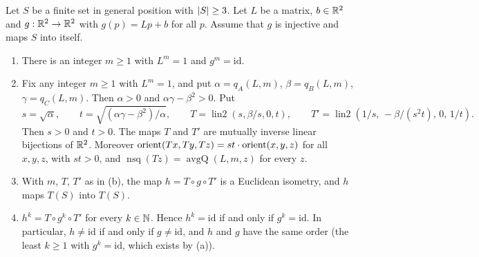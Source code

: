 \begin{proposition}\label{ar:prop:averaging}
Let $S$ be a finite set in general position with $\lvert S\rvert\ge3$. Let $L$ be a matrix, $b\in\mathbb R^2$ and
$g:\mathbb R^2\to\mathbb R^2$ with $g(p)=Lp+b$ for all $p$. Assume that $g$ is injective and maps $S$ into itself.
\begin{enumerate}[label=\textup{(\alph*)}]
\item There is an integer $m\ge1$ with $L^m=1$ and $g^m=\mathrm{id}$.
\item Fix any integer $m\ge1$ with $L^m=1$, and put $\alpha=q_A(L,m)$, $\beta=q_B(L,m)$, $\gamma=q_C(L,m)$. Then
$\alpha>0$ and $\alpha\gamma-\beta^2>0$. Put
\[
s=\sqrt\alpha,\qquad t=\sqrt{(\alpha\gamma-\beta^2)/\alpha},\qquad
T=\operatorname{lin2}(s,\beta/s,0,t),\qquad T'=\operatorname{lin2}(1/s,\,-\beta/(s^2t),\,0,\,1/t).
\]
Then $s>0$ and $t>0$. The maps $T$ and $T'$ are mutually inverse linear bijections of $\mathbb R^2$. Moreover
$\operatorname{orient}(Tx,Ty,Tz)=st\cdot\operatorname{orient}(x,y,z)$ for all $x,y,z$, with $st>0$, and
$\operatorname{nsq}(Tz)=\operatorname{avgQ}(L,m,z)$ for every $z$.
\item With $m$, $T$, $T'$ as in \textup{(b)}, the map $h=T\circ g\circ T'$ is a Euclidean isometry, and $h$ maps
$T(S)$ into $T(S)$.
\item $h^k=T\circ g^k\circ T'$ for every $k\in\mathbb N$. Hence $h^k=\mathrm{id}$ if and only if $g^k=\mathrm{id}$. In
particular, $h\ne\mathrm{id}$ if and only if $g\ne\mathrm{id}$, and $h$ and $g$ have the same order (the least $k\ge1$
with $g^k=\mathrm{id}$, which exists by \textup{(a)}).
\end{enumerate}
\end{proposition}

